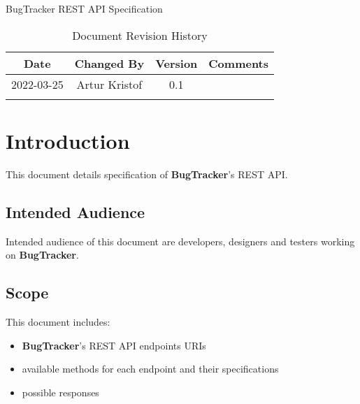 \documentclass[a4paper]{article}
\newcommand{\appName}{BugTracker}
\newcommand{\appNameBold}{\textbf{BugTracker}}
\begin{document}
    \begin{titlepage}
        \vspace*{\fill}
        \begin{center}
            \huge
            \appName{}
            \vspace{0.4cm}
            \Huge
            REST API Specification
            \vspace{3cm}
            \begin{table}[h]
                \centering
                \caption{Document Revision History}
                \begin{tabular}{cccc}
                    \hline
                    Date       & Changed By    & Version & Comments \\
                    \hline
                    2022-03-25 & Artur Kristof & 0.1     & \hfill   \\
                    \hfill     & \hfill        & \hfill  & \hfill   \\
                    \hline
                \end{tabular}
            \end{table}
        \end{center}
        \vspace*{\fill}
    \end{titlepage}




    \tableofcontents




    \pagebreak
    \section{Introduction}
    This document details specification of \appNameBold{}'s REST API.

    \subsection{Intended Audience}
    Intended audience of this document are developers, designers and testers working on \appNameBold{}.

    \subsection{Scope}
    This document includes:
    \begin{itemize}
        \item \appNameBold{}'s REST API endpoints URIs
        \item available methods for each endpoint and their specifications
        \item possible responses
    \end{itemize}
\end{document}
